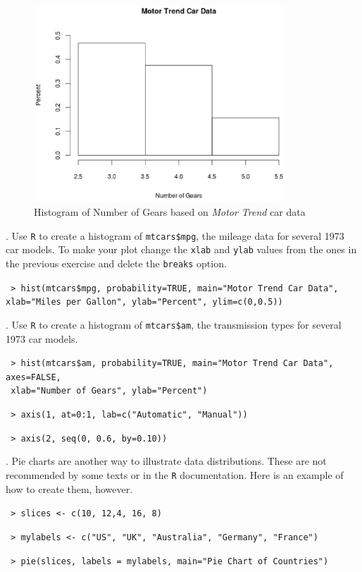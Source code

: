 \documentclass[10pt]{article}
\newcounter{EX}\setcounter{EX}{1}
\newcommand{\EXERCISE}{\arabic{EX}.\stepcounter{EX} }
\begin{document}
\begin{figure}[h]
\begin{center}
\includegraphics[height=2.9in, bb=0 16 550 360, clip]{MTcarsGears.eps}\vspace{-5pt}
\caption{\label{fig:gears}Histogram of Number of Gears based on \textit{Motor Trend} car data}\vspace{-1in}
\end{center}
\end{figure}
\vspace{.8in}

\EXERCISE  Use \texttt{R} to create a histogram of \texttt{mtcars\$mpg}, the mileage data for
  several 1973 car models.  To make your plot change the \texttt{xlab} and \texttt{ylab}
values from the ones in the previous exercise and delete the \texttt{breaks} option.


\texttt{ > hist(mtcars\$mpg, probability=TRUE, main="Motor Trend Car Data",}
\hphantom{+ }\texttt{  xlab="Miles per Gallon", ylab="Percent", ylim=c(0,0.5))}


\EXERCISE  Use \texttt{R} to create a histogram of \texttt{mtcars\$am}, the transmission
  types for  several 1973 car models.  \par

\texttt{ > hist(mtcars\$am, probability=TRUE, main="Motor Trend Car Data", axes=FALSE,}\\
\hphantom{+ }\texttt{  xlab="Number of Gears", ylab="Percent")}\par
\texttt{ > axis(1, at=0:1, lab=c("Automatic", "Manual"))}\par
\texttt{ > axis(2, seq(0, 0.6, by=0.10))}\par
\medskip

\EXERCISE Pie charts are another way to illustrate data distributions.  
These are not 
recommended by some texts or in the \texttt{R} documentation.  
Here is an example of how
to create them, however.

\texttt{ > slices <- c(10, 12,4, 16, 8)}\vspace{-2pt}

\texttt{ > mylabels <- c("US", "UK", "Australia", "Germany", "France")}\vspace{-2pt}

\texttt{ > pie(slices, labels = mylabels, main="Pie Chart of Countries")}

\vfill
\eject
\end{document}

